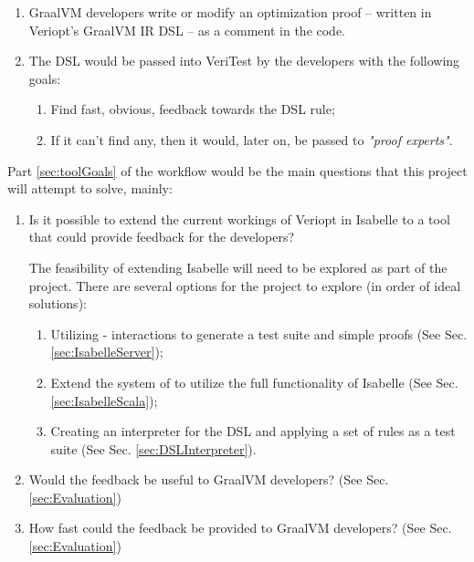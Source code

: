 \begin{enumerate}
    \item GraalVM developers write or modify an optimization proof -- written in Veriopt's GraalVM IR DSL -- as a comment in the code.
    \item The DSL would be passed into VeriTest by the developers with the following goals:
        
          \label{sec:toolGoals}
          \begin{enumerate}
            \item Find fast, obvious, feedback towards the DSL rule;
            \item If it can't find any, then it would, later on, be passed to \emph{"proof experts"}.
          \end{enumerate}
\end{enumerate}

Part \ref{sec:toolGoals} of the workflow would be the main questions that this project will attempt to solve, mainly:

\begin{enumerate}
    \item Is it possible to extend the current workings of Veriopt in Isabelle to a tool that could provide feedback for the developers?    
    
          The feasibility of extending Isabelle will need to be explored as part of the project. There are several options for the project to explore 
          (in order of ideal solutions):
          \begin{enumerate}
              \item Utilizing  -  interactions \cite[Ch. 4]{isabelleSystem} to generate a test suite and 
                    simple proofs \cite{isabelleQuickcheck,isabelleProof,isabelleNitpick,isabelleSledgehammer} (See Sec. \ref{sec:IsabelleServer});
              \item Extend the system of  to utilize the full functionality of Isabelle \cite[Ch. 5]{isabelleSystem}
                    (See Sec. \ref{sec:IsabelleScala});
              \item Creating an interpreter for the DSL and applying a set of rules as a test suite (See Sec. \ref{sec:DSLInterpreter}).
          \end{enumerate}

    \item Would the feedback be useful to GraalVM developers? (See Sec. \ref{sec:Evaluation})
    \item How fast could the feedback be provided to GraalVM developers? (See Sec. \ref{sec:Evaluation})
\end{enumerate}

